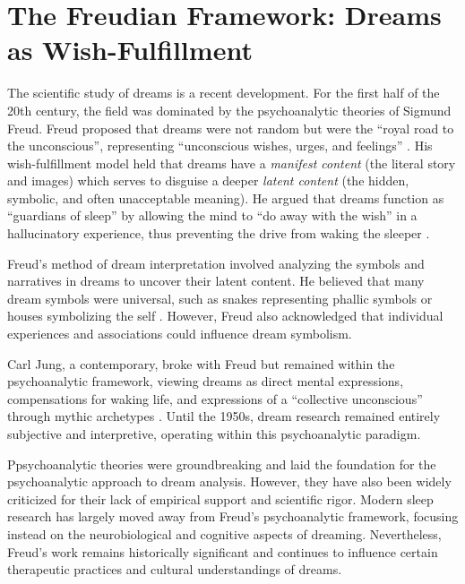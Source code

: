 \section{The Freudian Framework: Dreams as Wish-Fulfillment}\label{sec:freud}

The scientific study of dreams is a recent development. For the first half of the 20th century, the field was dominated by the psychoanalytic theories of Sigmund Freud. Freud proposed that dreams were not random but were the ``royal road to the unconscious'', representing ``unconscious wishes, urges, and feelings'' \citep{freud1900dreams}. His wish-fulfillment model held that dreams have a \textit{manifest content} (the literal story and images) which serves to disguise a deeper \textit{latent content} (the hidden, symbolic, and often unacceptable meaning). He argued that dreams function as ``guardians of sleep'' by allowing the mind to ``do away with the wish'' in a hallucinatory experience, thus preventing the drive from waking the sleeper \citep{freud1900dreams}.

Freud's method of dream interpretation involved analyzing the symbols and narratives in dreams to uncover their latent content. He believed that many dream symbols were universal, such as snakes representing phallic symbols or houses symbolizing the self \citep{freud1900dreams}. However, Freud also acknowledged that individual experiences and associations could influence dream symbolism.

Carl Jung, a contemporary, broke with Freud but remained within the psychoanalytic framework, viewing dreams as direct mental expressions, compensations for waking life, and expressions of a ``collective unconscious'' through mythic archetypes \citep{jung1974dreams}. Until the 1950s, dream research remained entirely subjective and interpretive, operating within this psychoanalytic paradigm.

Ppsychoanalytic theories were groundbreaking and laid the foundation for the psychoanalytic approach to dream analysis. However, they have also been widely criticized for their lack of empirical support and scientific rigor. Modern sleep research has largely moved away from Freud's psychoanalytic framework, focusing instead on the neurobiological and cognitive aspects of dreaming. Nevertheless, Freud's work remains historically significant and continues to influence certain therapeutic practices and cultural understandings of dreams.

